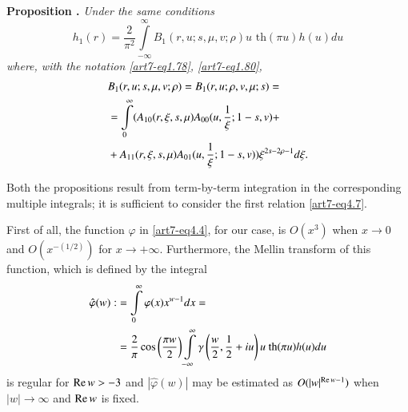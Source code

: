 \medskip
\noindent
{\bfseries Proposition .\label{art7-prop8}}
\textit{Under the same conditions}
\begin{equation}
h_1(r) = \frac{2}{\pi^2} \int\limits^\infty_{-\infty} B_1 (r, u; s, \mu, v; \rho) u \text{ th}  (\pi u) h(u) du \label{art7-eq4.10}
\end{equation}
\textit{where, with the notation \eqref{art7-eq1.78}, \eqref{art7-eq1.80},}
\begin{align}
& B_1 (r, u; s , \mu, v; \rho) = B_1(r,u; \rho, v, \mu; s) = \label{art7-eq4.11}\\
& = \int\limits^\infty_0 (A_{10} (r, \xi, s, \mu) A_{00} (u, \frac{1}{\xi}; 1- s, v) + \notag\\
& + A_{11} (r, \xi, s, \mu) A_{01} (u, \frac{1}{\xi}; 1 - s , v) ) \xi^{2s-2\rho -1} d\xi. \notag
\end{align}

Both the propositions result from term-by-term integration in the corresponding multiple integrals; it is sufficient to consider the first relation \eqref{art7-eq4.7}.

First of all, the function $\varphi$ in \eqref{art7-eq4.4}, for our case, is $O(x^3)$ when $x \to 0$ and $O(x^{-(1/2)})$ for $x \to + \infty$. Furthermore, the Mellin transform of this function, which is defined by the integral
\begin{align}
\hat{\varphi} (w) : & =  \int\limits^\infty_0 \varphi (x) x^{w-1}   dx = \label{art7-eq4.12}\\
& = \frac{2}{\pi} \cos \left(\frac{\pi w}{2} \right) \int\limits^\infty_{-\infty} \gamma \left(\frac{w}{2}, \frac{1}{2} + iu \right) u \text{ th} (\pi u) h(u) du \notag
\end{align}
is regular for $\operatorname{Re} w > -3$ and $|\hat{\varphi} (w)|$ may be estimated as $O(|w|^{\operatorname{Re} w-1})$ when $|w | \to \infty$ and $\operatorname{Re} w$ is fixed. 

